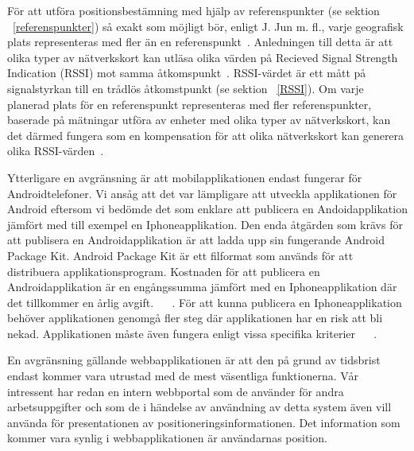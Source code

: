 \documentclass[a4paper,12pt]{article}
\begin{document}
 För att utföra positionsbestämning med hjälp av referenspunkter (se sektion ~\ref{referenspunkter}) så exakt som möjligt bör, enligt J. Jun m. fl., varje geografisk plats representeras med fler än en referenspunkt~\cite{jun2018low}.
 Anledningen till detta är att olika typer av nätverkskort kan utläsa olika värden på Recieved Signal Strength Indication (RSSI) mot samma åtkomspunkt~\cite{problem_with_RSSI}. RSSI-värdet är ett mått på signalstyrkan till en trådlös åtkomstpunkt (se sektion ~\ref{RSSI}). Om varje planerad plats för en referenspunkt representeras med fler referenspunkter, baserade på mätningar utföra av enheter med olika typer av nätverkskort, kan det därmed fungera som en kompensation för att olika nätverkskort kan generera olika RSSI-värden~\cite{jun2018low}.

Ytterligare en avgränsning är att mobilapplikationen endast fungerar för Androidtelefoner.
Vi ansåg att det var lämpligare att utveckla applikationen för Android eftersom vi bedömde det som enklare att publicera en Andoidapplikation jämfört med till exempel en Iphoneapplikation. Den enda åtgärden som krävs för att publisera en Androidapplikation är att ladda upp sin fungerande Android Package Kit. Android Package Kit är ett filformat som används för att distribuera applikationsprogram. Kostnaden för att publicera en Androidapplikation är en engångssumma jämfört med en Iphoneapplikation där det tillkommer en årlig avgift. ~\cite{android} ~\cite{guidePublish}. För att kunna publicera en Iphoneapplikation behöver applikationen genomgå fler steg där applikationen har en risk att bli nekad. Applikationen måste även fungera enligt vissa specifika kriterier ~\cite{submitIphone} ~\cite{guidePublish}.

 En avgränsning gällande webbapplikationen är att den på grund av tidsbrist endast kommer vara utrustad med de mest väsentliga funktionerna. Vår intressent har redan en intern webbportal som de använder för andra arbetsuppgifter och som de i händelse av användning av detta system även vill använda för presentationen av positioneringsinformationen. Det information som kommer vara synlig i webbapplikationen är användarnas position.

\end{document}
